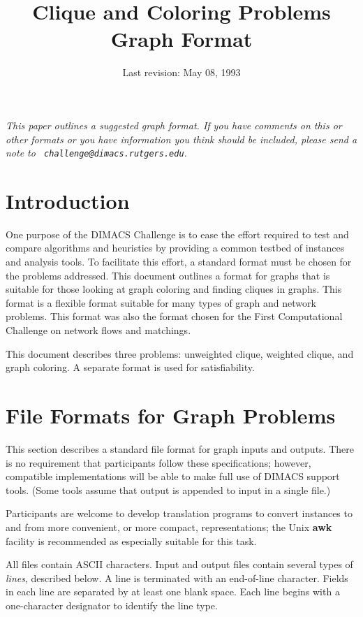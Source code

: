 \title{Clique and Coloring Problems\\Graph Format}
\author{}
\date{Last revision: May 08, 1993}

\maketitle
{\narrower\it This paper outlines a suggested graph format.  If you
have comments on this or other formats or you have information you
think should be included, please send a note to {\tt
challenge@dimacs.rutgers.edu}.}

\section{Introduction}
One purpose of the DIMACS Challenge is to ease the effort required to
test and compare algorithms and heuristics by providing a common
testbed of instances and analysis tools.  To facilitate this effort, a
standard format must be chosen for the problems addressed.  This
document outlines a format for graphs that is suitable for those
looking at graph coloring and finding cliques in graphs.  This format
is a flexible format suitable for many types of graph and network
problems.  This format was also the format chosen for the First
Computational Challenge on network flows and matchings.

This document describes three problems:  unweighted clique, weighted
clique, and graph coloring.  A separate format is used for
satisfiability.


\section{File Formats for Graph Problems} 

This section describes a standard file format for graph inputs and outputs. 
There is no  requirement that participants follow these specifications;
however, compatible implementations will be able to make full use of 
DIMACS support tools.  (Some tools assume that output is appended
to input in a single file.) 

Participants are welcome to develop translation programs to convert
instances to and from more convenient, or more compact, representations;
the Unix {\bf awk} facility is recommended as especially suitable
for this task.   

All files contain ASCII characters.  Input and output files contain
several types of {\em lines}, described below.  A line is terminated
with an end-of-line character.  Fields in each line are separated by
at least one blank space.  Each line begins with a one-character
designator to identify the line type.

